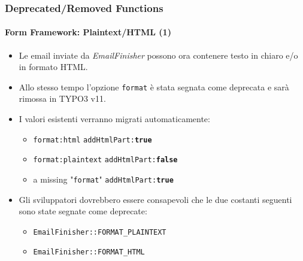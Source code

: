 
\begin{frame}[fragile]
	\frametitle{Deprecated/Removed Functions}
	\framesubtitle{Form Framework: Plaintext/HTML (1)}

	\begin{itemize}
		\item Le email inviate da \textit{EmailFinisher} possono ora contenere testo in chiaro e/o in formato HTML.

		\item Allo stesso tempo l'opzione \texttt{format} è stata segnata come deprecata e sarà rimossa in TYPO3 v11.

		\item I valori esistenti verranno migrati automaticamente:

			\begin{itemize}\smaller
				\item \texttt{format:html} \tabto{3cm}\textrightarrow\hspace{0.1cm}\texttt{addHtmlPart:\textbf{true}}
				\item \texttt{format:plaintext} \tabto{3cm}\textrightarrow\hspace{0.1cm}\texttt{addHtmlPart:\textbf{false}}
				\item a missing "\texttt{format}" \tabto{3cm}\textrightarrow\hspace{0.1cm}\texttt{addHtmlPart:\textbf{true}}
			\end{itemize}\normalsize

		\item Gli sviluppatori dovrebbero essere consapevoli che le due costanti seguenti sono state segnate come deprecate:

			\begin{itemize}\smaller
				\item \texttt{EmailFinisher::FORMAT\_PLAINTEXT}
				\item \texttt{EmailFinisher::FORMAT\_HTML}
			\end{itemize}\normalsize

	\end{itemize}

\end{frame}


